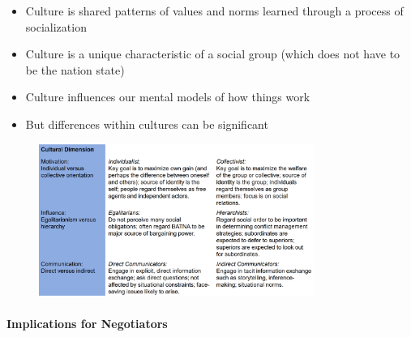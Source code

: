 \begin{itemize}
    \item Culture is shared patterns of values and norms learned through a
        process of socialization
    \item Culture is a unique characteristic of a social group (which does not
        have to be the nation state)
    \item Culture influences our mental models of how things work
    \item But differences within cultures can be significant
\end{itemize}

\begin{figure}[h]
    \centering
    \includegraphics[width=0.8\textwidth]{Pictures/Possible_cultural_dimensions_of_interest.png}
\end{figure}

\paragraph{Implications for Negotiators}

